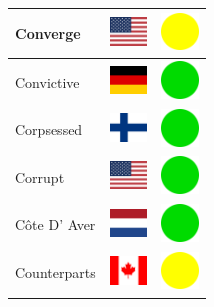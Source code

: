 \documentclass[12pt, a4paper, twoside]{report}
\begin{document}
\begin{center}
\begin{longtable}{|p{5cm}|p{2cm}|p{2cm}|}
Converge & \includegraphics[width=1cm]{4x3/us} & \includegraphics[width=1cm]{likes/m} \\ \hline
Convictive & \includegraphics[width=1cm]{4x3/de} & \includegraphics[width=1cm]{likes/y} \\ \hline
Corpsessed & \includegraphics[width=1cm]{4x3/fi} & \includegraphics[width=1cm]{likes/y} \\ \hline
Corrupt & \includegraphics[width=1cm]{4x3/us} & \includegraphics[width=1cm]{likes/y} \\ \hline
Côte D' Aver & \includegraphics[width=1cm]{4x3/nl} & \includegraphics[width=1cm]{likes/y} \\ \hline
Counterparts & \includegraphics[width=1cm]{4x3/ca} & \includegraphics[width=1cm]{likes/m} \\ \hline

\end{longtable}
\end{center}
\end{document}

